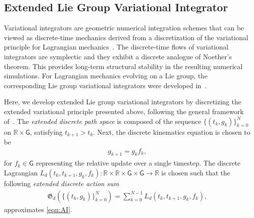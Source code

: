 \documentclass[letterpaper, 10pt, conference]{ieeeconf}
\newcommand{\G}{\ensuremath{\mathsf{G}}}
\renewcommand{\Re}{\ensuremath{\mathbb{R}}}
\begin{document}
\subsection{Extended Lie Group Variational Integrator}

Variational integrators are geometric numerical integration schemes that can be viewed as discrete-time mechanics derived from a discretization of the variational principle for Lagrangian mechanics~\cite{MarWesAN01}.
The discrete-time flows of variational integrators are symplectic and they exhibit a discrete analogue of Noether's theorem.
This provides long-term structural stability in the resulting numerical simulations. 
For Lagrangian mechanics evolving on a Lie group, the corresponding Lie group variational integrators were developed in~\cite{LeeLeoCMAME07}.

Here, we develop extended Lie group variational integrators by discretizing the extended variational principle presented above, following the general framework of~\cite{MarWesAN01}.
The \textit{extended discrete path space} is composed of the sequence $\{(t_k, g_k)\}_{k=0}^N$ on $\Re\times\G$, satisfying $t_{k+1}>t_k$.
Next, the discrete kinematics equation is chosen to be
\begin{align}
    g_{k+1} = g_k f_k, \label{eqn:gkp}
\end{align}
for $f_k \in\G$ representing the relative update over a single timestep. 
The discrete Lagrangian $L_d(t_k, t_{k+1}, g_k, f_k): \Re\times\Re\times\G\times\G\rightarrow \Re$ is chosen such that the following \textit{extended discrete action sum}
\begin{align}
    \mathfrak{G}_d(\{(t_k, g_k)\}_{k=0}^N) = \sum_{k=0}^{N-1} L_d(t_k, t_{k+1}, g_k, f_k), \label{eqn:Gd}
\end{align}
approximates \eqref{eqn:AI}. 
\end{document}
